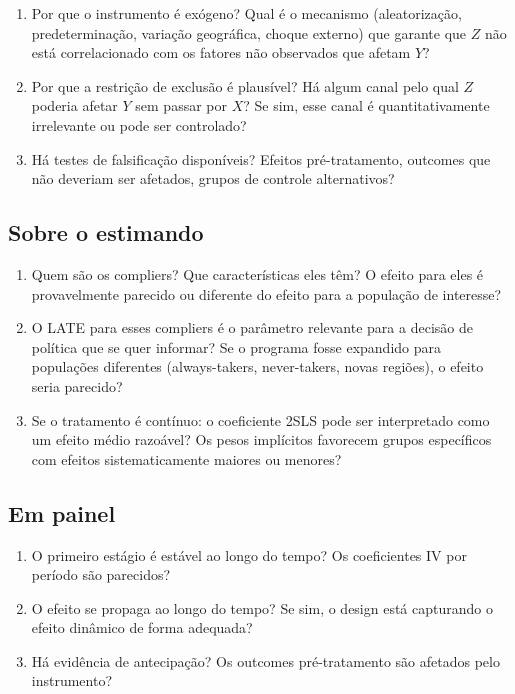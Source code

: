 \begin{enumerate}[leftmargin=*, label=\textbf{\arabic*.}, start=6]
  \item Por que o instrumento é exógeno? Qual é o mecanismo (aleatorização, predeterminação, variação geográfica, choque externo) que garante que $Z$ não está correlacionado com os fatores não observados que afetam $Y$?
  \item Por que a restrição de exclusão é plausível? Há algum canal pelo qual $Z$ poderia afetar $Y$ sem passar por $X$? Se sim, esse canal é quantitativamente irrelevante ou pode ser controlado?
  \item Há testes de falsificação disponíveis? Efeitos pré-tratamento, outcomes que não deveriam ser afetados, grupos de controle alternativos?
\end{enumerate}

\subsection*{Sobre o estimando}

\begin{enumerate}[leftmargin=*, label=\textbf{\arabic*.}, start=9]
  \item Quem são os compliers? Que características eles têm? O efeito para eles é provavelmente parecido ou diferente do efeito para a população de interesse?
  \item O LATE para esses compliers é o parâmetro relevante para a decisão de política que se quer informar? Se o programa fosse expandido para populações diferentes (always-takers, never-takers, novas regiões), o efeito seria parecido?
  \item Se o tratamento é contínuo: o coeficiente 2SLS pode ser interpretado como um efeito médio razoável? Os pesos implícitos favorecem grupos específicos com efeitos sistematicamente maiores ou menores?
\end{enumerate}

\subsection*{Em painel}

\begin{enumerate}[leftmargin=*, label=\textbf{\arabic*.}, start=12]
  \item O primeiro estágio é estável ao longo do tempo? Os coeficientes IV por período são parecidos?
  \item O efeito se propaga ao longo do tempo? Se sim, o design está capturando o efeito dinâmico de forma adequada?
  \item Há evidência de antecipação? Os outcomes pré-tratamento são afetados pelo instrumento?
\end{enumerate}

